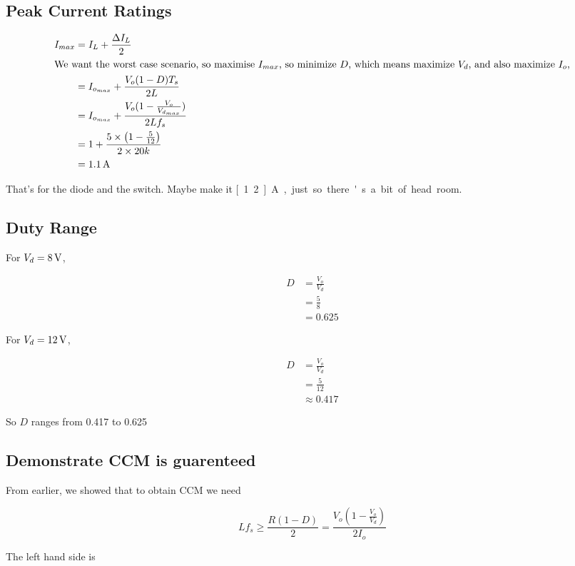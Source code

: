 \subsection*{Peak Current Ratings}

\begin{align*}
I_{max} & = I_L + \frac{\Delta I_L}{2} \\
\intertext{We want the worst case scenario, so maximise $I_{max}$, so minimize $D$, which means maximize $V_d$, and also maximize $I_o$,}
        & = I_{o_{max}} + \frac{V_o (1-D)T_s}{2L} \\
        & = I_{o_{max}} + \frac{V_o (1-\frac{V_o}{V_{d_{max}}})}{2Lf_s} \\ 
        & = 1 + \frac{5 \times \left( 1 - \frac{5}{12}\right)}{2 \times 20k} \\
        & = \unit[1.1]{A}
\end{align*}

That's for the diode and the switch.
Maybe make it \unit[1.2]{A}, just so there's a bit of head room.

\subsection*{Duty Range}

For $V_d=\unit[8]{V}$,

\begin{align*}
D & = \frac{V_o}{V_d} \\
  & = \frac{5}{8} \\
  & = 0.625
\end{align*}


For $V_d=\unit[12]{V}$,

\begin{align*}
D & = \frac{V_o}{V_d} \\
  & = \frac{5}{12} \\
  & \approx 0.417
\end{align*}

So $D$ ranges from 0.417 to 0.625

\subsection*{Demonstrate CCM is guarenteed}

From earlier, we showed that to obtain CCM we need

$$
Lf_s \geq \frac{R(1-D)}{2} = \frac{V_o \left( 1 - \frac{V_o}{V_d}\right)}{2 I_o}
$$

The left hand side is

